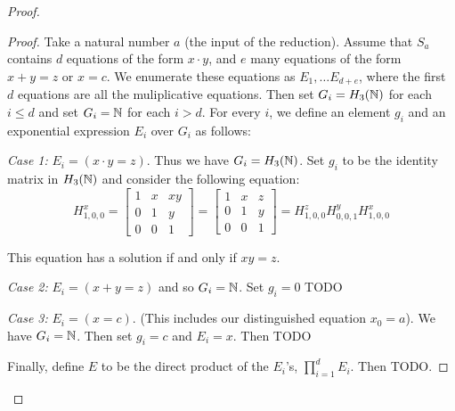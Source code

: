 \documentclass[11pt, titlepage]{article}
\begin{document}
\begin{proof}
\begin{proof}
  Take a natural number $a$ (the input of the reduction). Assume that
  $S_a$ contains $d$ equations of the form $x\cdot y$, and $e$ many
  equations of the form $x+y = z$ or $x = c$. We enumerate these
  equations as $E_1, \ldots E_{d+e}$, where the first $d$ equations
  are all the muliplicative equations. Then set $G_i = H_3(\mathbb{N})$ for
  each $i \leq d$ and set $G_i = \mathbb{N}$ for each $i > d$. For every $i$,
  we define an element $g_i$ and an exponential expression $E_i$ over
  $G_i$ as follows:

  \textit{Case 1:} $E_i = (x \cdot y = z)$. Thus we have
  $G_i = H_3(\mathbb{N})$. Set $g_i$ to be the identity matrix in $H_3(\mathbb{N})$
  and consider the following equation:
  \[
    H^x_{1,0,0} =
    \begin{bmatrix}
      1 & x & xy \\
      0 & 1 & y \\
      0 & 0 & 1
    \end{bmatrix} = 
    \begin{bmatrix}
      1 & x & z \\
      0 & 1 & y \\
      0 & 0 & 1
    \end{bmatrix} = 
    H^z_{1,0,0} H^y_{0,0,1} H^x_{1,0,0}
  \]

  This equation has a solution if and only if $xy = z$.

  \textit{Case 2:} $E_i = (x+y=z)$ and so $G_i= \mathbb{N}$. Set $g_i = 0$ TODO

  \textit{Case 3:} $E_i = (x = c)$. (This includes our distinguished
  equation $x_0 = a$). We have $G_i = \mathbb{N}$. Then set $g_i = c$ and
  $E_i = x$. Then TODO

  Finally, define $E$ to be the direct product of the $E_i$'s,
  $\prod_{i=1}^d E_i$. Then TODO.
\end{proof} %



\end{proof} %
\end{document}
